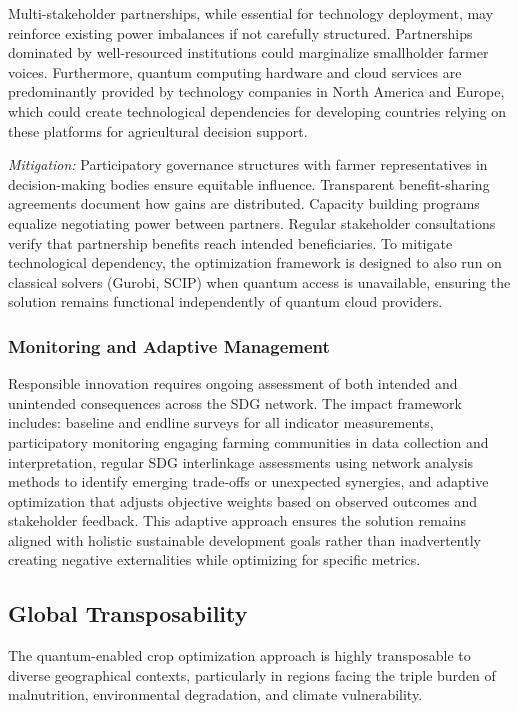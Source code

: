 \documentclass{oqireport}
\begin{document}
Multi-stakeholder partnerships, while essential for technology deployment, may reinforce existing power imbalances if not carefully structured. Partnerships dominated by well-resourced institutions could marginalize smallholder farmer voices. Furthermore, quantum computing hardware and cloud services are predominantly provided by technology companies in North America and Europe, which could create technological dependencies for developing countries relying on these platforms for agricultural decision support.

\textit{Mitigation:} Participatory governance structures with farmer representatives in decision-making bodies ensure equitable influence. Transparent benefit-sharing agreements document how gains are distributed. Capacity building programs equalize negotiating power between partners. Regular stakeholder consultations verify that partnership benefits reach intended beneficiaries. To mitigate technological dependency, the optimization framework is designed to also run on classical solvers (Gurobi, SCIP) when quantum access is unavailable, ensuring the solution remains functional independently of quantum cloud providers.

\subsubsection{Monitoring and Adaptive Management}

Responsible innovation requires ongoing assessment of both intended and unintended consequences across the SDG network. The impact framework includes: baseline and endline surveys for all indicator measurements, participatory monitoring engaging farming communities in data collection and interpretation, regular SDG interlinkage assessments using network analysis methods \cite{Fanzo2022} to identify emerging trade-offs or unexpected synergies, and adaptive optimization that adjusts objective weights based on observed outcomes and stakeholder feedback. This adaptive approach ensures the solution remains aligned with holistic sustainable development goals rather than inadvertently creating negative externalities while optimizing for specific metrics.

\subsection{Global Transposability}

The quantum-enabled crop optimization approach is highly transposable to diverse geographical contexts, particularly in regions facing the triple burden of malnutrition, environmental degradation, and climate vulnerability.
\end{document}
